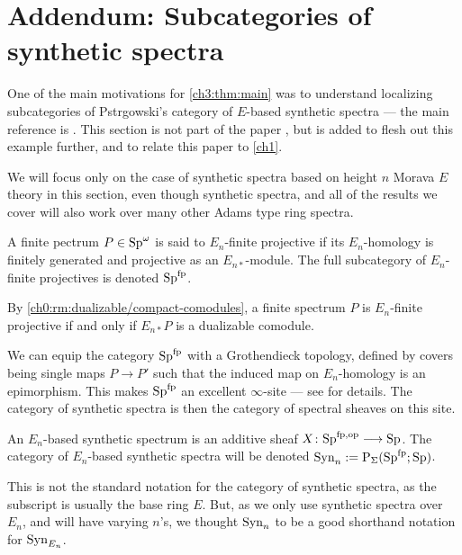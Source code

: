 
\section{Addendum: Subcategories of synthetic spectra}

One of the main motivations for \cref{ch3:thm:main} was to understand localizing subcategories of Pstr\a{}gowski's category of $E$-based synthetic spectra --- the main reference is \cite{pstragowski_2022}. This section is not part of the paper \cite{aambo_2024_localizing}, but is added to flesh out this example further, and to relate this paper to \cref{ch1}. 

We will focus only on the case of synthetic spectra based on height $n$ Morava $E$ theory in this section, even though synthetic spectra, and all of the results we cover will also work over many other Adams type ring spectra. 

\begin{definition}
    A finite pectrum $P\in \mathrm{Sp}^\omega$ is said to $E_n$-finite projective if its $E_n$-homology is finitely generated and projective as an $E_{n*}$-module. The full subcategory of $E_n$-finite projectives is denoted $\mathrm{Sp}^{\mathrm{fp}}$. 
\end{definition}

\begin{remark}
    By \cref{ch0:rm:dualizable/compact-comodules}, a finite spectrum $P$ is $E_n$-finite projective if and only if $E_{n*}P$ is a dualizable comodule. 
\end{remark}

We can equip the category $\mathrm{Sp}^{\mathrm{fp}}$ with a Grothendieck topology, defined by covers being single maps $P\to P'$ such that the induced map on $E_n$-homology is an epimorphism. This makes $\mathrm{Sp}^{\mathrm{fp}}$ an excellent $\infty$-site --- see \cite[Section 2.3]{pstragowski_2022} for details. The category of synthetic spectra is then the category of spectral sheaves on this site. 

\begin{definition}
    An $E_n$-based synthetic spectrum is an additive sheaf $X\colon \mathrm{Sp}^{\mathrm{fp}, \mathrm{op}}\longrightarrow \mathrm{Sp}$. The category of $E_n$-based synthetic spectra will be denoted $\mathrm{Syn}_n := \mathrm{P}_\Sigma(\mathrm{Sp}^{\mathrm{fp}};\mathrm{Sp})$. 
\end{definition}

\begin{remark}
    This is not the standard notation for the category of synthetic spectra, as the subscript is usually the base ring $E$. But, as we only use synthetic spectra over $E_n$, and will have varying $n$'s, we thought $\mathrm{Syn}_n$ to be a good shorthand notation for $\mathrm{Syn}_{E_n}$. 
\end{remark}

